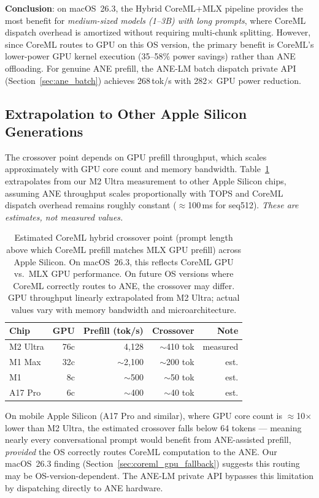 \documentclass[11pt]{article}
\begin{document}
\textbf{Conclusion}: on macOS~26.3, the Hybrid CoreML+MLX pipeline
provides the most benefit for \emph{medium-sized models (1--3B) with long
prompts}, where CoreML dispatch overhead is amortized without requiring
multi-chunk splitting.
However, since CoreML routes to GPU on this OS version, the primary
benefit is CoreML's lower-power GPU kernel execution (35--58\% power
savings) rather than ANE offloading.
For genuine ANE prefill, the ANE-LM batch dispatch private API
(Section~\ref{sec:ane_batch}) achieves 268\,tok/s with 282$\times$ GPU
power reduction.

\subsection{Extrapolation to Other Apple Silicon Generations}
\label{sec:extrapolation}

The crossover point depends on GPU prefill throughput, which scales
approximately with GPU core count and memory bandwidth.
Table~\ref{tab:crossover} extrapolates from our M2 Ultra measurement to
other Apple Silicon chips, assuming ANE throughput scales proportionally
with TOPS and CoreML dispatch overhead remains roughly constant
($\approx$100\,ms for seq512).
\emph{These are estimates, not measured values.}

\begin{table}[h]
\centering
\small
\begin{tabular}{@{}lrrrr@{}}
\toprule
Chip & GPU & Prefill (tok/s) & Crossover & Note \\
\midrule
M2 Ultra & 76c & 4{,}128 & $\sim$410 tok & measured \\
M1 Max   & 32c & $\sim$2{,}100 & $\sim$200 tok & est. \\
M1       &  8c & $\sim$500    & $\sim$50 tok  & est. \\
A17 Pro  &  6c & $\sim$400    & $\sim$40 tok  & est. \\
\bottomrule
\end{tabular}
\caption{Estimated CoreML hybrid crossover point (prompt length above
  which CoreML prefill matches MLX GPU prefill) across Apple Silicon.
  On macOS~26.3, this reflects CoreML GPU vs.\ MLX GPU performance.
  On future OS versions where CoreML correctly routes to ANE, the
  crossover may differ.
  GPU throughput linearly extrapolated from M2 Ultra; actual values
  vary with memory bandwidth and microarchitecture.}
\label{tab:crossover}
\end{table}

On mobile Apple Silicon (A17 Pro and similar), where GPU core count is
$\approx$10$\times$ lower than M2 Ultra, the estimated crossover falls
below 64 tokens --- meaning nearly every conversational prompt would
benefit from ANE-assisted prefill, \emph{provided} the OS correctly
routes CoreML computation to the ANE.
Our macOS~26.3 finding (Section~\ref{sec:coreml_gpu_fallback}) suggests
this routing may be OS-version-dependent.
The ANE-LM private API bypasses this limitation by dispatching directly
to ANE hardware.
\end{document}
